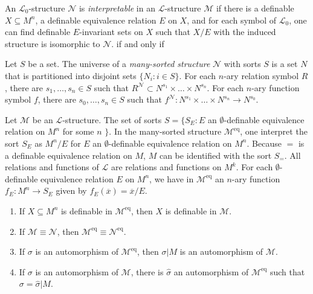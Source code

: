 \documentclass[
	fontsize=10pt, %
]{kaohandt}
\begin{document}
\begin{definition}
    An $\mathcal{L}_0$-structure $\mathcal{N}$ is \emph{interpretable} in an $\mathcal{L}$-structure $\mathcal{M}$ if there is a definable $X \subseteq M^n$, a definable equivalence relation $E$ on $X$,
    and for each symbol of $\mathcal{L}_0$, one can find definable $E$-invariant sets on $X$ such that $X / E$ with the induced structure is isomorphic to $\mathcal{N}$.
if and only if 
\end{definition}

Let $S$ be a set.
The universe of a \emph{many-sorted structure} $\mathcal{N}$ with sorts $S$ is 
a set $N$ that is partitioned into disjoint sets $\{N_i : i \in S\}$.
For each $n$-ary relation symbol $R$,
there are $s_1,\dots,s_n \in S$ such that $R^{\mathcal{N}} \subset N^{s_1} \times \dots \times N^{s_n}$.
For each $n$-ary function symbol $f$,
there are $s_0,\dots,s_n \in S$ such that $f^{\mathcal{N}} : N^{s_1} \times \dots \times N^{s_n} \to N^{s_0}$.

Let $\mathcal{M}$ be an $\mathcal{L}$-structure.
The set of sorts $S = \{S_E : E$ an $\emptyset$-definable equivalence relation on $M^n$ for some $n$ $\}$.
In the many-sorted structure $\mathcal{M}^{\mathrm{eq}}$,
one interpret the sort $S_E$ as $M^n / E$ for $E$ an $\emptyset$-definable equivalence relation on $M^n$.
Because $=$ is a definable equivalence relation on $M$,
$M$ can be identified with the sort $S_{=}$.
All relations and functions of $\mathcal{L}$ are relations and functions on $M^k$.
For each $\emptyset$-definable equivalence relation $E$ on $M^n$,
we have in $\mathcal{M}^{\mathrm{eq}}$ an $n$-ary function $f_E: M^n \to S_E$ given by $f_E(\overline{x}) = \overline{x} / E$.

\begin{lemma}
    \begin{enumerate}[label = {\roman*)}]
        \item If $X \subseteq M^n$ is definable in $\mathcal{M}^{\mathrm{eq}}$, then $X$ is definable in $\mathcal{M}$.
        \item If $\mathcal{M} \equiv \mathcal{N}$, then $\mathcal{M}^{\mathrm{eq}} \equiv \mathcal{N}^{\mathrm{eq}}$.
        \item If $\sigma$ is an automorphism of $\mathcal{M}^{\mathrm{eq}}$, then $\sigma|M$ is an automorphism of $\mathcal{M}$.
        \item If $\sigma$ is an automorphism of $\mathcal{M}$, there is $\widehat{\sigma}$ an automorphism of $\mathcal{M}^{\mathrm{eq}}$ such that $\sigma = \widehat{\sigma}|M$.
    \end{enumerate}
\end{lemma}
\end{document}
